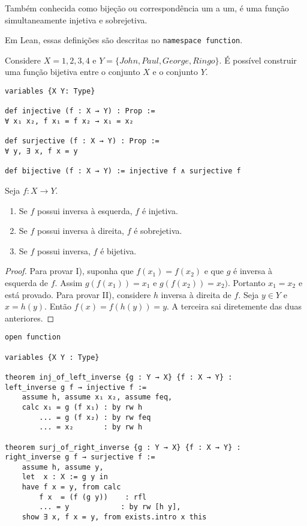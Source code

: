 \begin{definition}
    \label{def7}
    Também conhecida como bijeção ou correspondência um a um, é uma função simultaneamente injetiva e
    sobrejetiva.
\end{definition}

Em Lean, essas definições são descritas no \lstinline{namespace function}.

\begin{example}
    Considere $X = {1,2,3,4}$ e $Y = \{John, Paul, George, Ringo\}$. É possível construir uma função bijetiva
    entre o conjunto $X$ e o conjunto $Y$.
\end{example}

\begin{lstlisting}
variables {X Y: Type}

def injective (f : X → Y) : Prop :=
∀ x₁ x₂, f x₁ = f x₂ → x₁ = x₂

def surjective (f : X → Y) : Prop :=
∀ y, ∃ x, f x = y

def bijective (f : X → Y) := injective f ∧ surjective f
\end{lstlisting}

\begin{theorem}
    \label{prop5}
    Seja $f : X \to Y$.
    \renewcommand{\labelenumi}{\Roman{enumi}}
    \begin{enumerate}
        \item Se $f$ possui inversa à esquerda, $f$ é injetiva.
        \item Se $f$ possui inversa à direita, $f$ é sobrejetiva.
        \item Se $f$ possui inversa, $f$ é bijetiva.
    \end{enumerate}
\end{theorem}
\begin{proof}
    Para provar I), suponha que $f(x_1) = f(x_2)$ e que $g$ é inversa à esquerda
    de $f$. Assim $g(f(x_1)) = x_1$ e $g(f(x_2)) = x_2)$. Portanto $x_1 = x_2$ e
    está provado. Para provar II), considere $h$ inversa à direita de $f$. Seja
    $y \in Y$ e $x = h(y)$. Então $f(x) = f(h(y)) = y$. A terceira sai diretemente
    das duas anteriores.
\end{proof}

\begin{lstlisting}
open function

variables {X Y : Type}

theorem inj_of_left_inverse {g : Y → X} {f : X → Y} :
left_inverse g f → injective f :=
    assume h, assume x₁ x₂, assume feq,
    calc x₁ = g (f x₁) : by rw h
        ... = g (f x₂) : by rw feq
        ... = x₂       : by rw h

theorem surj_of_right_inverse {g : Y → X} {f : X → Y} :
right_inverse g f → surjective f :=
    assume h, assume y,
    let  x : X := g y in
    have f x = y, from calc
        f x  = (f (g y))    : rfl
        ... = y            : by rw [h y],
    show ∃ x, f x = y, from exists.intro x this
\end{lstlisting}

